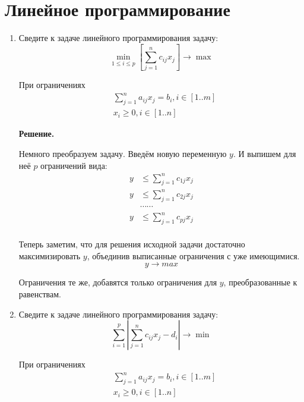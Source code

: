 \section*{Линейное программирование}
\begin{enumerate}
	\item Сведите к задаче линейного программирования задачу:
	\begin{equation*}
		\min\limits_{1 \leqslant i \leqslant p} \left[ \sum\limits_{j = 1}^n c_{ij} x_j \right] \to \max
	\end{equation*}
	
	При ограничениях 
	\begin{align*}
		& \sum\limits_{j = 1}^n a_{ij} x_j = b_i, i \in [1..m] \\
		& x_i \geqslant 0, i \in [1..n]
	\end{align*}
	
	\textbf{Решение.}
	
	Немного преобразуем задачу. Введём новую переменную $y$. И выпишем для неё $p$ ограничений вида:
	\begin{align*}
		y &\leqslant \sum\limits_{j = 1}^nc_{1j}x_j \\
		y &\leqslant \sum\limits_{j = 1}^nc_{2j}x_j \\
		&\cdots\cdots \\
		y &\leqslant \sum\limits_{j = 1}^nc_{pj}x_j \\
	\end{align*}
	
	Теперь заметим, что для решения исходной задачи достаточно максимизировать $y$, объединив выписанные ограничения с уже имеющимися.
	\begin{equation*}
		y \to max
	\end{equation*}
	
	Ограничения те же, добавятся только ограничения для $y$, преобразованные к равенствам.
		
	\item Сведите к задаче линейного программирования задачу:
	\begin{equation*}
	\sum\limits_{i = 1}^p \left|\sum\limits_{j = 1}^n c_{ij}x_j - d_i\right| \to \min
	\end{equation*}
	
	При ограничениях 
	\begin{align*}
	& \sum\limits_{j = 1}^n a_{ij} x_j = b_i, i \in [1..m] \\
	& x_i \geqslant 0, i \in [1..n]
	\end{align*}
	

\end{enumerate}
